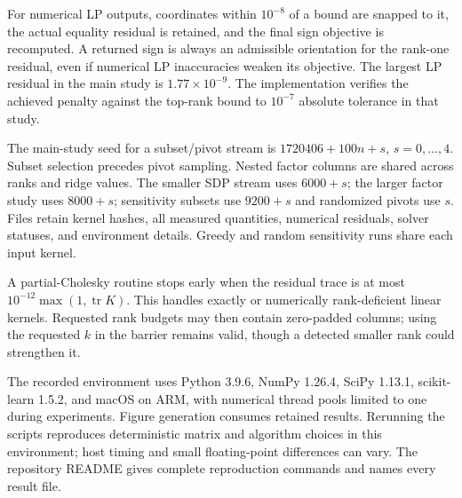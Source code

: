 \documentclass[11pt]{article}
\theoremstyle{definition}\newtheorem{definition}[theorem]{Definition}
\newcommand{\tr}{\operatorname{tr}}
\begin{document}
For numerical LP outputs, coordinates within $10^{-8}$ of a bound are snapped to it, the actual equality residual is retained, and the final sign objective is recomputed. A returned sign is always an admissible orientation for the rank-one residual, even if numerical LP inaccuracies weaken its objective. The largest LP residual in the main study is $1.77\times10^{-9}$. The implementation verifies the achieved penalty against the top-rank bound to $10^{-7}$ absolute tolerance in that study.

The main-study seed for a subset/pivot stream is $1720406+100n+s$, $s=0,\ldots,4$. Subset selection precedes pivot sampling. Nested factor columns are shared across ranks and ridge values. The smaller SDP stream uses $6000+s$; the larger factor study uses $8000+s$; sensitivity subsets use $9200+s$ and randomized pivots use $s$. Files retain kernel hashes, all measured quantities, numerical residuals, solver statuses, and environment details. Greedy and random sensitivity runs share each input kernel.

A partial-Cholesky routine stops early when the residual trace is at most $10^{-12}\max(1,\tr K)$. This handles exactly or numerically rank-deficient linear kernels. Requested rank budgets may then contain zero-padded columns; using the requested $k$ in the barrier remains valid, though a detected smaller rank could strengthen it.

The recorded environment uses Python 3.9.6, NumPy 1.26.4, SciPy 1.13.1, scikit-learn 1.5.2, and macOS on ARM, with numerical thread pools limited to one during experiments. Figure generation consumes retained results. Rerunning the scripts reproduces deterministic matrix and algorithm choices in this environment; host timing and small floating-point differences can vary. The repository README gives complete reproduction commands and names every result file.
\end{document}
